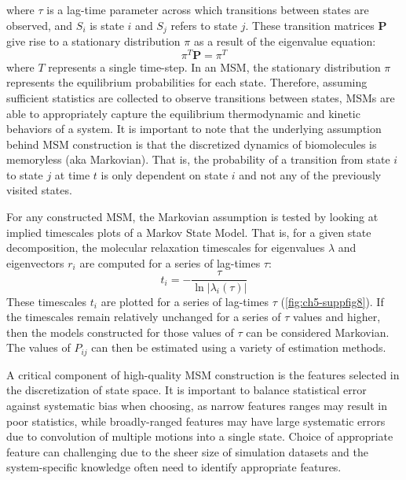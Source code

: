 \documentclass[../main.tex]{subfiles}
\begin{document}
        where $\tau$ is a lag-time parameter across which transitions between states are observed, and $S_i$ is state $i$ and $S_j$ refers to state $j$. These transition matrices $\textbf{P}$ give rise to a stationary distribution $\pi$ as a result of the eigenvalue equation: 
        \begin{equation}\label{stationary-dist-eigenvalue-eq}
        	\pi^T\textbf{P}=\pi^T
        \end{equation}
        where $T$ represents a single time-step. In an MSM, the stationary distribution $\pi$ represents the equilibrium probabilities for each state. Therefore, assuming sufficient statistics are collected to observe transitions between states, MSMs are able to appropriately capture the equilibrium thermodynamic and kinetic behaviors of a system. It is important to note that the underlying assumption behind MSM construction is that the discretized dynamics of biomolecules is memoryless (aka Markovian). That is, the probability of a transition from state $i$ to state $j$ at time $t$ is only dependent on state $i$ and not any of the previously visited states.

        For any constructed MSM, the Markovian assumption is tested by looking at implied timescales plots of a Markov State Model. That is, for a given state decomposition, the molecular relaxation timescales for eigenvalues $\lambda$ and eigenvectors $r_i$ are computed for a series of lag-times $\tau$:
        \begin{equation}\label{implied-timescales-eq}
        	t_i=-\frac{\tau}{\ln|\lambda_i(\tau)|}
        \end{equation}
        These timescales $t_i$ are plotted for a series of lag-times $\tau$ (\ref{fig:ch5-suppfig8}). If the timescales remain relatively unchanged for a series of $\tau$ values and higher, then the models constructed for those values of $\tau$ can be considered Markovian. The values of $P_{ij}$ can then be estimated using a variety of estimation methods\cite{Zimmerman:2018jn,Chodera:2014gk}.

        A critical component of high-quality MSM construction is the features selected in the discretization of state space. It is important to balance statistical error against systematic bias when choosing, as narrow features ranges may result in poor statistics, while broadly-ranged features may have large systematic errors due to convolution of multiple motions into a single state. Choice of appropriate feature can challenging due to the sheer size of simulation datasets and the system-specific knowledge often need to identify appropriate features. 
\end{document}

